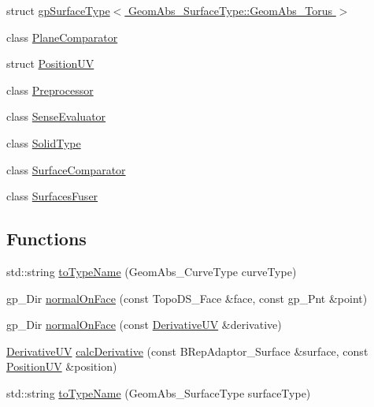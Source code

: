 \begin{DoxyCompactItemize}
\item 
struct \hyperlink{structMcCAD_1_1Tools_1_1gpSurfaceType_3_01GeomAbs__SurfaceType_1_1GeomAbs__Torus_01_4}{gp\+Surface\+Type$<$ Geom\+Abs\+\_\+\+Surface\+Type\+::\+Geom\+Abs\+\_\+\+Torus $>$}
\item 
class \hyperlink{classMcCAD_1_1Tools_1_1PlaneComparator}{Plane\+Comparator}
\item 
struct \hyperlink{structMcCAD_1_1Tools_1_1PositionUV}{Position\+UV}
\item 
class \hyperlink{classMcCAD_1_1Tools_1_1Preprocessor}{Preprocessor}
\item 
class \hyperlink{classMcCAD_1_1Tools_1_1SenseEvaluator}{Sense\+Evaluator}
\item 
class \hyperlink{classMcCAD_1_1Tools_1_1SolidType}{Solid\+Type}
\item 
class \hyperlink{classMcCAD_1_1Tools_1_1SurfaceComparator}{Surface\+Comparator}
\item 
class \hyperlink{classMcCAD_1_1Tools_1_1SurfacesFuser}{Surfaces\+Fuser}
\end{DoxyCompactItemize}
\subsection*{Functions}
\begin{DoxyCompactItemize}
\item 
std\+::string \hyperlink{namespaceMcCAD_1_1Tools_a2c3c43d2878c73f69424e7b32f87bb2b}{to\+Type\+Name} (Geom\+Abs\+\_\+\+Curve\+Type curve\+Type)
\item 
gp\+\_\+\+Dir \hyperlink{namespaceMcCAD_1_1Tools_a5e0090a8dd0489c030624ee30a098110}{normal\+On\+Face} (const Topo\+D\+S\+\_\+\+Face \&face, const gp\+\_\+\+Pnt \&point)
\item 
gp\+\_\+\+Dir \hyperlink{namespaceMcCAD_1_1Tools_ab4303c5e4df844f0195928903b3819f4}{normal\+On\+Face} (const \hyperlink{structMcCAD_1_1Tools_1_1DerivativeUV}{Derivative\+UV} \&derivative)
\item 
\hyperlink{structMcCAD_1_1Tools_1_1DerivativeUV}{Derivative\+UV} \hyperlink{namespaceMcCAD_1_1Tools_a4bc929678a434c45096f3816af9143ad}{calc\+Derivative} (const B\+Rep\+Adaptor\+\_\+\+Surface \&surface, const \hyperlink{structMcCAD_1_1Tools_1_1PositionUV}{Position\+UV} \&position)
\item 
std\+::string \hyperlink{namespaceMcCAD_1_1Tools_a9d065c1e584e08a0cf4def99482a9476}{to\+Type\+Name} (Geom\+Abs\+\_\+\+Surface\+Type surface\+Type)
\end{DoxyCompactItemize}



